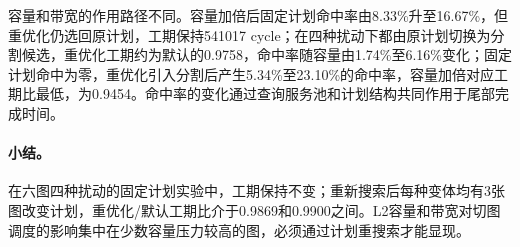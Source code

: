 容量和带宽的作用路径不同。容量加倍后固定计划命中率由8.33\%升至16.67\%，但重优化仍选回原计划，工期保持541017 cycle；在四种扰动下都由原计划切换为分割候选，重优化工期约为默认的0.9758，命中率随容量由1.74\%至6.16\%变化；固定计划命中为零，重优化引入分割后产生5.34\%至23.10\%的命中率，容量加倍对应工期比最低，为0.9454。命中率的变化通过查询服务池和计划结构共同作用于尾部完成时间。

\paragraph{小结。}
在六图四种扰动的固定计划实验中，工期保持不变；重新搜索后每种变体均有3张图改变计划，重优化/默认工期比介于0.9869和0.9900之间。L2容量和带宽对切图调度的影响集中在少数容量压力较高的图，必须通过计划重搜索才能显现。
